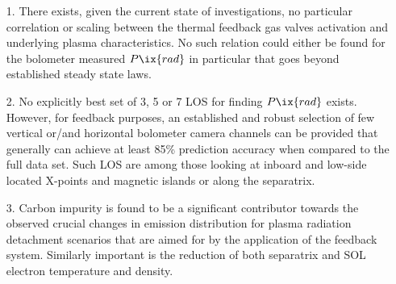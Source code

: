     \begin{enumerate}%
        \item[1.]{%
            There exists, given the current state of investigations, no particular correlation or scaling between the thermal feedback gas valves activation and underlying plasma characteristics. No such relation could either be found for the bolometer measured $P\ix{rad}$ in particular that goes beyond established steady state laws.}%
        \item[2.]{%
            No explicitly best set of 3, 5 or 7 LOS for finding $P\ix{rad}$ exists. However, for feedback purposes, an established and robust selection of few vertical or/and horizontal bolometer camera channels can be provided that generally can achieve at least 85\% prediction accuracy when compared to the full data set. Such LOS are among those looking at inboard and low-side located X-points and magnetic islands or along the separatrix.}%
        \item[3.]{%
            Carbon impurity is found to be a significant contributor towards the observed crucial changes in emission distribution for plasma radiation detachment scenarios that are aimed for by the application of the feedback system. Similarly important is the reduction of both separatrix and SOL electron temperature and density.}%
    \end{enumerate}%
